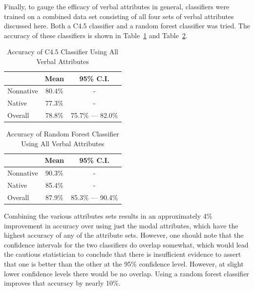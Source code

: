 \documentclass[main.tex]{subfiles}
\begin{document}
Finally, to gauge the efficacy of verbal attributes in general, classifiers were trained on a combined data set consisting of all four sets of verbal attributes discussed here. Both a C4.5 classifier and a random forest classifier was tried. The accuracy of these classifiers is shown in Table~\ref{table:c45-combined-results} and Table~\ref{table:combined-results}.
\begin{table}[htbp]
\centering
\caption{Accuracy of C4.5 Classifier Using All Verbal Attributes}
\begin{tabular}{l c c}
\toprule
& Mean & 95\% C.I.\\
\midrule
Nonnative & 80.4\% & - \\
[6pt]Native & 77.3\% & - \\
[6pt]Overall & 78.8\% & 75.7\% --- 82.0\% \\
\bottomrule
\end{tabular}
\label{table:c45-combined-results}
\end{table}
\begin{table}[htbp]
\centering
\caption{Accuracy of Random Forest Classifier Using All Verbal Attributes}
\begin{tabular}{l c c}
\toprule
& Mean & 95\% C.I.\\
\midrule
Nonnative & 90.3\% & - \\
[6pt]Native & 85.4\% & - \\
[6pt]Overall & 87.9\% & 85.3\% --- 90.4\% \\
\bottomrule
\end{tabular}
\label{table:combined-results}
\end{table}
Combining the various attributes sets results in an approximately 4\% improvement in accuracy over using just the modal attributes, which have the highest accuracy of any of the attribute sets. However, one should note that the confidence intervals for the two classifiers do overlap somewhat, which would lead the cautious statistician to conclude that there is insufficient evidence to assert that one is better than the other at the 95\% confidence level. However, at slight lower confidence levels there would be no overlap. Using a random forest classifier improves that accuracy by nearly 10\%.
\biblio
\end{document}
